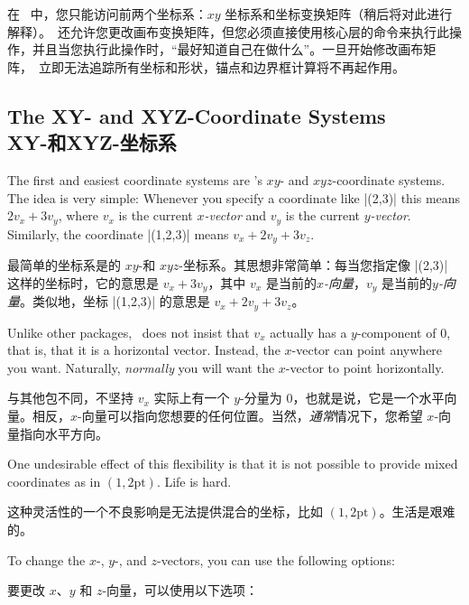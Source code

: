 在 \tikzname\ 中，您只能访问前两个坐标系：$xy$ 坐标系和坐标变换矩阵（稍后将对此进行解释）。\pgfname\ 还允许您更改画布变换矩阵，但您必须直接使用核心层的命令来执行此操作，并且当您执行此操作时，“最好知道自己在做什么”。一旦开始修改画布矩阵，\pgfname\ 立即无法追踪所有坐标和形状，锚点和边界框计算将不再起作用。


\subsection{The XY- and XYZ-Coordinate Systems\\XY-和XYZ-坐标系}
\label{section-xyz}

The first and easiest coordinate systems are \pgfname's $xy$- and
$xyz$-coordinate systems. The idea is very simple: Whenever you specify a
coordinate like |(2,3)| this means $2v_x + 3v_y$, where $v_x$ is the current
\emph{$x$-vector} and $v_y$ is the current \emph{$y$-vector}. Similarly, the
coordinate |(1,2,3)| means $v_x + 2v_y + 3v_z$.

最简单的坐标系是\pgfname 的 $xy$-和 $xyz$-坐标系。其思想非常简单：每当您指定像 |(2,3)| 这样的坐标时，它的意思是 $v_x + 3v_y$，其中 $v_x$ 是当前的\emph{$x$-向量}，$v_y$ 是当前的\emph{$y$-向量}。类似地，坐标 |(1,2,3)| 的意思是 $v_x + 2v_y + 3v_z$。

Unlike other packages, \pgfname\ does not insist that $v_x$ actually has a
$y$-component of $0$, that is, that it is a horizontal vector. Instead, the
$x$-vector can point anywhere you want. Naturally, \emph{normally} you will
want the $x$-vector to point horizontally.

与其他包不同，\pgfname 不坚持 $v_x$ 实际上有一个 $y$-分量为 $0$，也就是说，它是一个水平向量。相反，$x$-向量可以指向您想要的任何位置。当然，\emph{通常}情况下，您希望 $x$-向量指向水平方向。

One undesirable effect of this flexibility is that it is not possible to
provide mixed coordinates as in $(1,2\mathrm{pt})$. Life is hard.

这种灵活性的一个不良影响是无法提供混合的坐标，比如 $(1,2\mathrm{pt})$。生活是艰难的。

To change the $x$-, $y$-, and $z$-vectors, you can use the following options:

要更改 $x$、$y$ 和 $z$-向量，可以使用以下选项：

